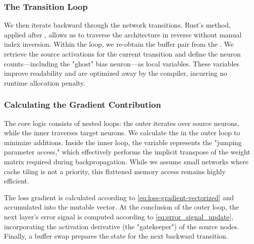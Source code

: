 \subsubsection{The Transition Loop}
We then iterate backward through the network transitions. Rust’s  method, applied after , allows us to traverse the architecture in reverse without manual index inversion. Within the loop, we re-obtain the buffer pair from the . We retrieve the source activations for the current transition and define the neuron counts—including the "ghost" bias neuron—as local variables. These  variables improve readability and are optimized away by the compiler, incurring no runtime allocation penalty.

\subsubsection{Calculating the Gradient Contribution}
The core logic consists of nested loops: the outer iterates over source neurons, while the inner traverses target neurons. We calculate the  in the outer loop to minimize additions. Inside the inner loop, the  variable represents the "jumping parameter access," which effectively performs the implicit transpose of the weight matrix required during backpropagation. While we assume small networks where cache tiling is not a priority, this flattened memory access remains highly efficient.

The loss gradient is calculated according to \eqref{eq:loss-gradient-vectorized} and accumulated into the mutable  vector. At the conclusion of the outer loop, the next layer's error signal is computed according to \eqref{eq:error_signal_update}, incorporating the activation derivative (the "gatekeeper") of the source nodes. Finally, a buffer swap prepares the state for the next backward transition.